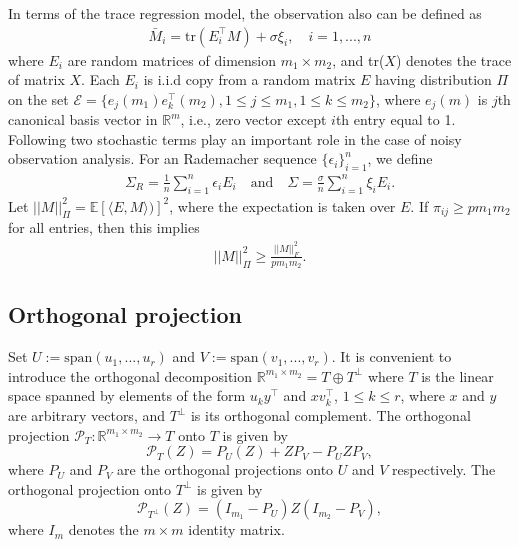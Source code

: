 \documentclass{article} %
\newcommand\mc{\mathcal} %
\begin{document}
In terms of the trace regression model, the observation also can be defined as
\begin{align}
\bar{M}_{i} = \text{tr}(E_i^\top M) + \sigma\xi_i, \quad i=1,...,n
\end{align}
where $E_i$ are random matrices of dimension $m_1 \times m_2$, and tr($X$) denotes the trace of matrix $X$. Each $E_i$ is i.i.d copy from a random matrix $E$ having distribution $\Pi$ on the set $\mathcal{E} = \{e_j(m_1)e_k^\top(m_2), 1\leq j \leq m_1, 1\leq k \leq m_2 \}$, where $e_j(m)$ is $j$th canonical basis vector in $\mathbb{R}^m$, i.e., zero vector except $i$th entry equal to 1. Following two stochastic terms play an important role in the case of noisy observation analysis. For an Rademacher sequence $\{\epsilon_i\}_{i=1}^{n}$, we define
\begin{align}
\Sigma_R = \frac{1}{n}\sum_{i=1}^{n}\epsilon_i E_i \quad \text{and} \quad\Sigma = \frac{\sigma}{n}\sum_{i=1}^{n}\xi_i E_i.
\end{align}
Let $||M||_\Pi^2 = \mathbb{E}[\langle E,M \rangle)]^2$, where the expectation is taken over ${E}$. If $\pi_{ij} \geq pm_1m_2$ for all entries, then this implies
\begin{align}
\label{eqn:fro_ineq}
||M||_\Pi^2 \geq \frac{||M||_F^2}{pm_1m_2}.
\end{align}

\subsection{Orthogonal projection}

Set $U := \text{span}(u_1,...,u_r)$ and $V := \text{span}(v_1,...,v_r)$. It is convenient to introduce the orthogonal decomposition $\mathbb{R}^{m_1 \times m_2} = T \oplus T^\perp$ where $T$ is the linear space spanned by elements of the form $u_ky^\top$ and $xv_k^\top$, $1\leq k \leq r$, where $x$ and $y$ are arbitrary vectors, and $T^\perp$ is its orthogonal complement. The orthogonal projection $\mc{P}_T:\mathbb{R}^{m_1 \times m_2} \rightarrow T$ onto $T$ is given by
\begin{equation}
\mc{P}_T(Z) = P_U(Z) + ZP_V - P_UZP_V,
\end{equation}
where $P_U$ and $P_V$ are the orthogonal projections onto $U$ and $V$ respectively. The orthogonal projection onto $T^\perp$ is given by
\begin{equation}
\mc{P}_{T^\perp}(Z) = (I_{m_1} - P_U)Z(I_{m_2} - P_V),
\end{equation}
where $I_m$ denotes the $m \times m$ identity matrix.
\end{document}
